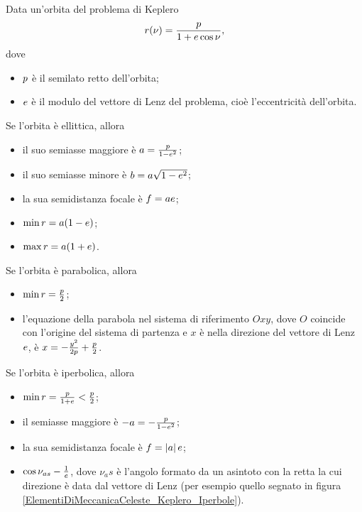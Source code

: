 \begin{Theorem}
	Data un'orbita del problema di Keplero
	\[
		r(\nu) = \frac{p}{1 + e \cos{\nu}},
	\]
	dove
	\begin{itemize}
		\item $p$ \`e il semilato retto dell'orbita;
		\item $e$ \`e il modulo del vettore di Lenz del problema, cio\`e l'eccentricit\`a dell'orbita.
	\end{itemize}
	Se l'orbita \`e ellittica, allora
	\begin{itemize}
		\item il suo semiasse maggiore \`e $a = \frac{p}{1 - e^2}$;
		\item il suo semiasse minore \`e $b = a \sqrt{1 - e^2}$;
		\item la sua semidistanza focale \`e $f = a e$;
		\item $\min r = a(1 - e)$;
		\item $\max r = a(1 + e)$.
	\end{itemize}
	Se l'orbita \`e parabolica, allora
	\begin{itemize}
		\item $\min r = \frac{p}{2}$;
		\item l'equazione della parabola nel sistema di riferimento $Oxy$, dove $O$ coincide con l'origine del sistema di partenza e $x$ \`e nella direzione del vettore di Lenz $e$, \`e $x = - \frac{y^2}{2 p} + \frac{p}{2}$.
	\end{itemize}
	Se l'orbita \`e iperbolica, allora
	\begin{itemize}
		\item $\min r = \frac{p}{1 + e} < \frac{p}{2}$;
		\item il semiasse maggiore \`e $- a = - \frac{p}{1 - e^2}$;
		\item la sua semidistanza focale \`e $f = \left \lvert a \right \rvert e$;
		\item $\cos \nu_{as} - \frac{1}{e}$, dove $\nu_as$ \`e l'angolo formato da un asintoto con la retta la cui direzione \`e data dal vettore di Lenz (per esempio quello segnato in figura \ref{ElementiDiMeccanicaCeleste_Keplero_Iperbole}).
	\end{itemize}
\end{Theorem}
